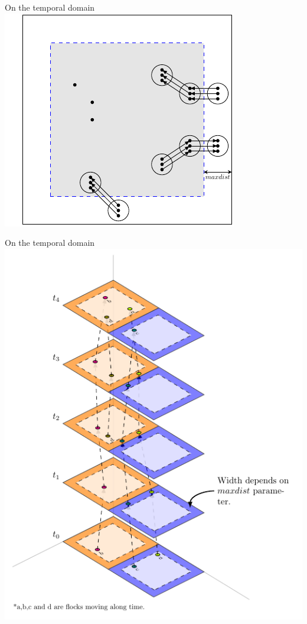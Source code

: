 \documentclass{beamer}
\begin{document}
    \begin{frame}{On the temporal domain}
        \centering
        \includegraphics[height=0.75\textheight]{../thesis/chapter4/figures/maxdist}
    \end{frame}

    \begin{frame}{On the temporal domain}
        \centering
        \includegraphics[height=0.9\textheight]{../thesis/chapter4/figures/plots/11_temporal_partitions/TemporalPartitioning}
    \end{frame}
\end{document}
